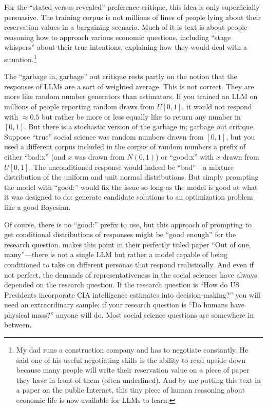 \documentclass[11pt]{article}
\begin{document}
For the ``stated versus revealed'' preference critique, this idea is only superficially persuasive.
The training corpus is not millions of lines of people lying about their reservation values in a bargaining scenario. 
Much of it is text is about people reasoning how to approach various economic questions, including ``stage whispers'' about their true intentions, explaining how they would deal with a situation.\footnote{
    My dad runs a construction company and has to negotiate constantly. 
    He said one of his useful negotiating skills is the ability to read upside down because many people will write their reservation value on a piece of paper they have in front of them (often underlined). And by me putting this text in a paper on the public Internet, this tiny piece of human reasoning about economic life is now available for LLMs to learn.
} 

The ``garbage in, garbage'' out critique rests partly on the notion that the responses of LLMs are a sort of weighted average.
This is not correct. 
They are more like random number generators than estimators. 
If you trained an LLM on millions of people reporting random draws from $U[0,1]$, it would not respond with $\approx 0.5$ but rather be more or less equally like to return any number in $[0,1]$.
But there is a stochastic version of the garbage in; garbage out critique. 
Suppose ``true'' social science was random numbers drawn from $[0,1]$, but you used a different corpus included in the corpus of random numbers a prefix of either ``bad:x'' (and $x$ was drawn from $N(0,1)$) or ``good:x'' with $x$ drawn from $U[0,1]$.
The unconditioned response would indeed be ``bad''---a mixture distribution of the uniform and unit normal distributions. 
But simply prompting the model with ``good:'' would fix the issue so long as the model is good at what it was designed to do: generate candidate solutions to an optimization problem like a good Bayesian.

Of course, there is no ``good:'' prefix to use, but this approach of prompting to get conditional distributions of responses might be ``good enough'' for the research question.
\cite{argyle2022out} makes this point in their perfectly titled paper ``Out of one, many''---there is not a single LLM but rather a model capable of being conditioned to take on different personas that respond realistically.
And even if not perfect, the demands of representativeness in the social sciences have always depended on the research question. 
If the research question is ``How do US Presidents incorporate CIA intelligence estimates into decision-making?'' you will need an extraordinary sample; if your research question is ``Do humans have physical mass?'' anyone will do.
Most social science questions are somewhere in between.
\end{document}
